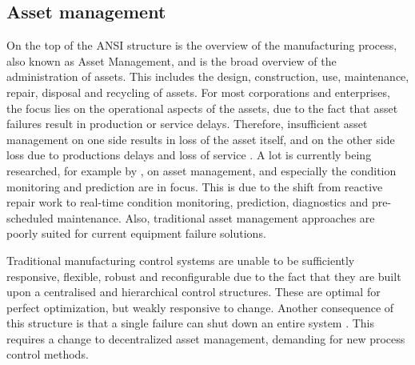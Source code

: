 	 


\subsection{Asset management}
On the top of the ANSI structure is the overview of the manufacturing process, also known as Asset Management, and is the broad overview of the administration of assets. This includes the design, construction, use, maintenance, repair, disposal and recycling of assets. For most corporations and enterprises, the focus lies on the operational aspects of the assets, due to the fact that asset failures result in production or service delays. Therefore, insufficient asset management on one side results in loss of the asset itself, and on the other side loss due to productions delays and loss of service \citep{trappey2013multi}.  A lot is currently being researched, for example by \citet{leitao2009agent}, on asset management, and especially the condition monitoring and prediction are in focus. This is due to the shift from reactive repair work to real-time condition monitoring, prediction, diagnostics and pre-scheduled maintenance. Also, traditional asset management approaches are poorly suited for current equipment failure solutions. %
	
Traditional manufacturing control systems are unable to be sufficiently responsive, flexible, robust and reconfigurable due to the fact that they are built upon a centralised and hierarchical control structures. These are optimal for perfect optimization, but weakly responsive to change. Another consequence of this structure is that a single failure can shut down an entire system \citep{leitao2009agent}. This requires a change to decentralized asset management, demanding for new process control methods.
	
	
